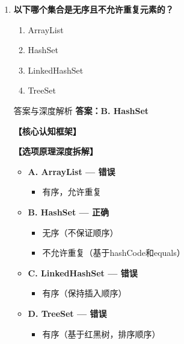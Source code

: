 \documentclass[12pt, a4paper]{ctexart}
\begin{document}
\begin{enumerate}[label=\textbf{\arabic*.}]
	      \vspace{1em}

	\item \textbf{以下哪个集合是无序且不允许重复元素的？}
	      \begin{enumerate}[label=\Alph*.]
		      \item ArrayList
		      \item HashSet
		      \item LinkedHashSet
		      \item TreeSet
	      \end{enumerate}

	      \begin{bluebox}{答案与深度解析}
		      \textbf{答案：B. HashSet}

		      \textbf{【核心认知框架】}

		      \textbf{【选项原理深度拆解】}
					  \begin{itemize}[label={}, leftmargin=*, nosep]

		      
		      \item \textbf{A. ArrayList — 错误}
					  \begin{itemize}[label={}, nosep]
		      
			      \item 有序，允许重复
		      

					  \end{itemize}
		      \item \textbf{B. HashSet — 正确}
					  \begin{itemize}[label={}, nosep]
		      
			      \item 无序（不保证顺序）
			      \item 不允许重复（基于hashCode和equals）
		      

					  \end{itemize}
		      \item \textbf{C. LinkedHashSet — 错误}
					  \begin{itemize}[label={}, nosep]
		      
			      \item 有序（保持插入顺序）
		      

					  \end{itemize}
		      \item \textbf{D. TreeSet — 错误}
					  \begin{itemize}[label={}, nosep]
		      
			      \item 有序（基于红黑树，排序顺序）
		      

\end{itemize}
\end{itemize}
\end{bluebox}
\end{enumerate}
\end{document}
